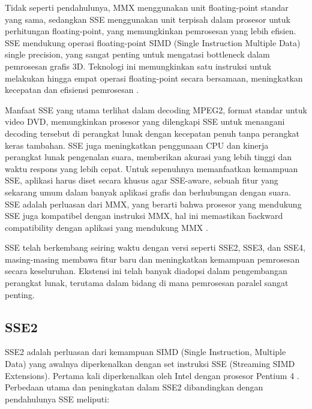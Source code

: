 Tidak seperti pendahulunya, MMX menggunakan unit floating-point standar yang sama, sedangkan SSE menggunakan unit terpisah dalam prosesor untuk perhitungan floating-point, yang memungkinkan pemrosesan yang lebih efisien. SSE mendukung operasi floating-point SIMD (Single Instruction Multiple Data) single precision, yang sangat penting untuk mengatasi bottleneck dalam pemrosesan grafis 3D. Teknologi ini memungkinkan satu instruksi untuk melakukan hingga empat operasi floating-point secara bersamaan, meningkatkan kecepatan dan efisiensi pemrosesan \cite{informitStreamingSIMD}.

Manfaat SSE yang utama terlihat dalam decoding MPEG2, format standar untuk video DVD, memungkinkan prosesor yang dilengkapi SSE untuk menangani decoding tersebut di perangkat lunak dengan kecepatan penuh tanpa perangkat keras tambahan. SSE juga meningkatkan penggunaan CPU dan kinerja perangkat lunak pengenalan suara, memberikan akurasi yang lebih tinggi dan waktu respons yang lebih cepat. Untuk sepenuhnya memanfaatkan kemampuan SSE, aplikasi harus diset secara khusus agar SSE-aware, sebuah fitur yang sekarang umum dalam banyak aplikasi grafis dan berhubungan dengan suara. SSE adalah perluasan dari MMX, yang berarti bahwa prosesor yang mendukung SSE juga kompatibel dengan instruksi MMX, hal ini memastikan \f{backward compatibility} dengan aplikasi yang mendukung MMX \cite{informitStreamingSIMD}.

SSE telah berkembang seiring waktu dengan versi seperti SSE2, SSE3, dan SSE4, masing-masing membawa fitur baru dan meningkatkan kemampuan pemrosesan secara keseluruhan. Ekstensi ini telah banyak diadopsi dalam pengembangan perangkat lunak, terutama dalam bidang di mana pemrosesan paralel sangat penting.

\subsection{SSE2}
SSE2 adalah perluasan dari kemampuan SIMD (Single Instruction, Multiple Data) yang awalnya diperkenalkan dengan set instruksi SSE (Streaming SIMD Extensions). Pertama kali diperkenalkan oleh Intel dengan prosesor Pentium 4 \cite{SystemVAppBinaryInterfaceMichael}. Perbedaan utama dan peningkatan dalam SSE2 dibandingkan dengan pendahulunya SSE meliputi:

